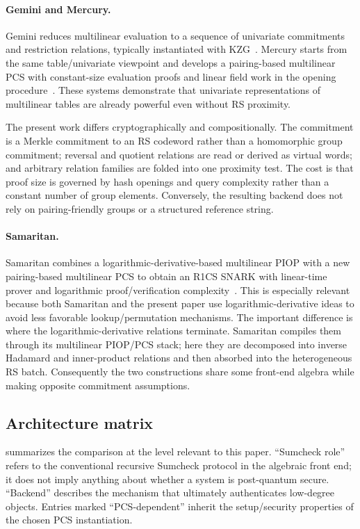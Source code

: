 \paragraph{Gemini and Mercury.}
Gemini reduces multilinear evaluation to a sequence of univariate commitments and restriction relations, typically instantiated with KZG~\cite{Gemini22}.  Mercury starts from the same table/univariate viewpoint and develops a pairing-based multilinear PCS with constant-size evaluation proofs and linear field work in the opening procedure~\cite{Mercury25}.  These systems demonstrate that univariate representations of multilinear tables are already powerful even without RS proximity.

The present work differs cryptographically and compositionally.  The commitment is a Merkle commitment to an RS codeword rather than a homomorphic group commitment; reversal and quotient relations are read or derived as virtual words; and arbitrary relation families are folded into one proximity test.  The cost is that proof size is governed by hash openings and query complexity rather than a constant number of group elements.  Conversely, the resulting backend does not rely on pairing-friendly groups or a structured reference string.

\paragraph{Samaritan.}
Samaritan combines a logarithmic-derivative-based multilinear PIOP with a new pairing-based multilinear PCS to obtain an R1CS SNARK with linear-time prover and logarithmic proof/verification complexity~\cite{Samaritan25}.  This is especially relevant because both Samaritan and the present paper use logarithmic-derivative ideas to avoid less favorable lookup/permutation mechanisms.  The important difference is where the logarithmic-derivative relations terminate.  Samaritan compiles them through its multilinear PIOP/PCS stack; here they are decomposed into inverse Hadamard and inner-product relations and then absorbed into the heterogeneous RS batch.  Consequently the two constructions share some front-end algebra while making opposite commitment assumptions.

\subsection{Architecture matrix}
\label{sec:comparison-matrix}

 summarizes the comparison at the level relevant to this paper.  ``Sumcheck role'' refers to the conventional recursive Sumcheck protocol in the algebraic front end; it does not imply anything about whether a system is post-quantum secure.  ``Backend'' describes the mechanism that ultimately authenticates low-degree objects.  Entries marked ``PCS-dependent'' inherit the setup/security properties of the chosen PCS instantiation.

